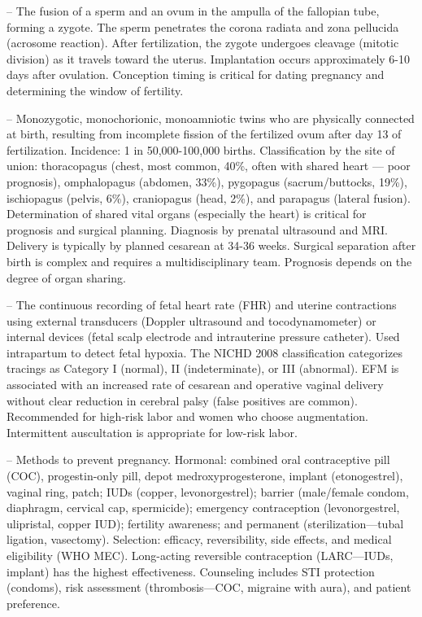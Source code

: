 -- The fusion of a sperm and an ovum in the ampulla of the fallopian tube, forming a zygote. The sperm penetrates the corona radiata and zona pellucida (acrosome reaction). After fertilization, the zygote undergoes cleavage (mitotic division) as it travels toward the uterus. Implantation occurs approximately 6-10 days after ovulation. Conception timing is critical for dating pregnancy and determining the window of fertility.

-- Monozygotic, monochorionic, monoamniotic twins who are physically connected at birth, resulting from incomplete fission of the fertilized ovum after day 13 of fertilization. Incidence: 1 in 50,000-100,000 births. Classification by the site of union: thoracopagus (chest, most common, 40\%, often with shared heart — poor prognosis), omphalopagus (abdomen, 33\%), pygopagus (sacrum/buttocks, 19\%), ischiopagus (pelvis, 6\%), craniopagus (head, 2\%), and parapagus (lateral fusion). Determination of shared vital organs (especially the heart) is critical for prognosis and surgical planning. Diagnosis by prenatal ultrasound and MRI. Delivery is typically by planned cesarean at 34-36 weeks. Surgical separation after birth is complex and requires a multidisciplinary team. Prognosis depends on the degree of organ sharing.

-- The continuous recording of fetal heart rate (FHR) and uterine contractions using external transducers (Doppler ultrasound and tocodynamometer) or internal devices (fetal scalp electrode and intrauterine pressure catheter). Used intrapartum to detect fetal hypoxia. The NICHD 2008 classification categorizes tracings as Category I (normal), II (indeterminate), or III (abnormal). EFM is associated with an increased rate of cesarean and operative vaginal delivery without clear reduction in cerebral palsy (false positives are common). Recommended for high-risk labor and women who choose augmentation. Intermittent auscultation is appropriate for low-risk labor.

-- Methods to prevent pregnancy. Hormonal: combined oral contraceptive pill (COC), progestin-only pill, depot medroxyprogesterone, implant (etonogestrel), vaginal ring, patch; IUDs (copper, levonorgestrel); barrier (male/female condom, diaphragm, cervical cap, spermicide); emergency contraception (levonorgestrel, ulipristal, copper IUD); fertility awareness; and permanent (sterilization—tubal ligation, vasectomy). Selection: efficacy, reversibility, side effects, and medical eligibility (WHO MEC). Long-acting reversible contraception (LARC—IUDs, implant) has the highest effectiveness. Counseling includes STI protection (condoms), risk assessment (thrombosis—COC, migraine with aura), and patient preference.

